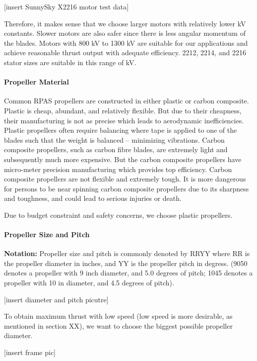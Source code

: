 [insert SunnySky X2216 motor test data]

Therefore, it makes sense that we choose larger motors with relatively lower kV constants. Slower motors 
are also safer since there is less angular momentum of the blades. Motors with 800 kV to 1300 kV are 
suitable for our applications and achieve reasonable thrust output with adequate efficiency. 2212, 2214, 
and 2216 stator sizes are suitable in this range of kV.

\paragraph{Propeller Material}

Common RPAS propellers are constructed in either plastic or carbon composite. Plastic is cheap, abundant, 
and relatively flexible. But due to their cheapness, their manufacturing is not as precise which leads to 
aerodynamic inefficiencies. Plastic propellers often require balancing where tape is applied to one of the 
blades such that the weight is balanced – minimizing vibrations. Carbon composite propellers, such as 
carbon fibre blades, are extremely light and subsequently much more expensive. But the carbon composite 
propellers have micro-meter precision manufacturing which provides top efficiency. Carbon composite 
propellers are not flexible and extremely tough. It is more dangerous for persons to be near spinning 
carbon composite propellers due to its sharpness and toughness, and could lead to serious injuries or death.

Due to budget constraint and safety concerns, we choose plastic propellers.

\paragraph{Propeller Size and Pitch}

\textbf{Notation: } Propeller size and pitch is commonly denoted by RRYY where RR is the propeller diameter in inches, and YY is the propeller pitch in degress. (9050 denotes a propeller with 9 inch diameter, and 5.0 degrees of pitch; 1045 denotes a propeller with 10 in diameter, and 4.5 degrees of pitch).

[insert diameter and pitch picutre]

To obtain maximum thrust with low speed (low speed is more desirable, as mentioned in section XX), we want to choose the biggest possible propeller diameter.

[insert frame pic]

